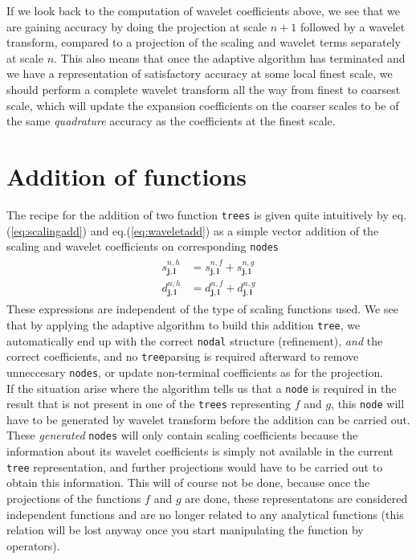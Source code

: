 \noindent
If we look back to the computation of wavelet coefficients above, we see that
we are gaining accuracy by doing the projection at scale $n+1$ followed
by a wavelet transform, compared to a projection of the scaling and wavelet
terms separately at scale $n$. This also means that once the adaptive
algorithm has terminated and we have a representation of satisfactory accuracy
at some local finest scale, we should perform a complete wavelet transform all
the way from finest to coarsest scale, which will update the expansion
coefficients on the coarser scales to be of the same \emph{quadrature}
accuracy as the coefficients at the finest scale.

\section{Addition of functions}
The recipe for the addition of two function \texttt{trees} is given quite
intuitively by eq.(\ref{eq:scalingadd}) and eq.(\ref{eq:waveletadd}) as a simple 
vector addition of the scaling and wavelet coefficients on corresponding 
\texttt{nodes}
\begin{align}
	\begin{split}
	s^{n,h}_{\boldsymbol{j},\boldsymbol{l}}
	&= s^{n,f}_{\boldsymbol{j},\boldsymbol{l}}+
	   s^{n,g}_{\boldsymbol{j},\boldsymbol{l}}\\
	d^{n,h}_{\boldsymbol{j},\boldsymbol{l}}
	&= d^{n,f}_{\boldsymbol{j},\boldsymbol{l}}+
	   d^{n,g}_{\boldsymbol{j},\boldsymbol{l}}
   \end{split}
\end{align}
These expressions are independent of the type of scaling functions used. We
see that by applying the adaptive algorithm to build this addition
\texttt{tree}, we automatically end up with the correct \texttt{nodal}
structure (refinement), \emph{and} the correct coefficients, and no 
\texttt{tree}parsing is required afterward to remove unneccesary
\texttt{nodes}, or update non-terminal coefficients as for the projection.\\

\noindent
If the situation arise where the algorithm tells us that a \texttt{node} is
required in the result that is not present in one of the \texttt{trees}
representing $f$ and $g$, this \texttt{node} will have to be generated by 
wavelet transform before the addition can be carried out. These \emph{generated}
\texttt{nodes} will only contain scaling coefficients because the information
about its wavelet coefficients is simply not available in the current
\texttt{tree} representation, and further projections would have to be carried
out to obtain this information. This will of course not be done, because once
the projections of the functions $f$ and $g$ are done, these representatons
are considered independent functions and are no longer related to any
analytical functions (this relation will be lost anyway once you start
manipulating the function by operators).\\

